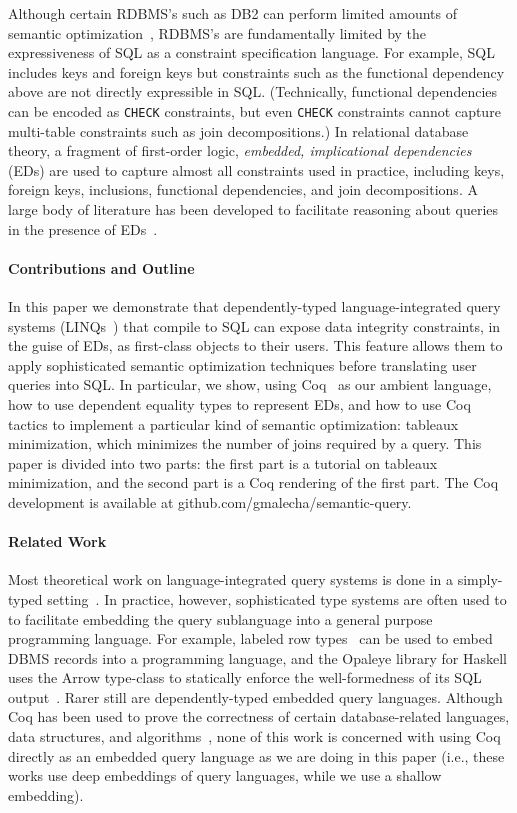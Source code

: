 \documentclass{sigplanconf}
\begin{document}
Although certain RDBMS's such as DB2 can perform limited amounts of semantic optimization~\cite{Cheng:1999:ITS:645925.671357}, RDBMS's are fundamentally limited by the expressiveness of SQL as a constraint specification language.
For example, SQL includes keys and foreign keys but constraints such as the functional dependency above are not directly expressible in SQL. (Technically, functional dependencies can be encoded as {\tt CHECK} constraints, but even {\tt CHECK} constraints cannot capture multi-table constraints such as join decompositions.)
In relational database theory, a fragment of first-order logic, {\it embedded, implicational dependencies} (EDs) are used to capture almost all constraints used in practice, including keys, foreign keys, inclusions, functional dependencies, and join decompositions.
A large body of literature has been developed to facilitate reasoning about queries in the presence of EDs~\cite{Popa99anequational}. 

\paragraph{Contributions and Outline} In this paper we demonstrate that dependently-typed language-integrated query systems (LINQs~\cite{monad}) that compile to SQL can expose data integrity constraints, in the guise of EDs, as first-class objects to their users. This feature allows them to apply sophisticated semantic optimization techniques before translating user queries into SQL.  In particular, we show, using Coq~\cite{coq:coq} as our ambient language, how to use dependent equality types to represent EDs, and how to use Coq tactics to implement a particular kind of semantic optimization: tableaux minimization, which minimizes the number of joins required by a query.  This paper is divided into two parts: the first part is a tutorial on tableaux minimization, and the second part is a Coq rendering of the first part. The Coq development is available at {\sf github.com/gmalecha/semantic-query}.

\paragraph{Related Work} Most theoretical work on language-integrated query systems is done in a simply-typed setting~\cite{tannen:1992:NEQ:645500.655920}.  In practice, however, sophisticated type systems are often used to to facilitate embedding the query sublanguage into a general purpose programming language.  For example, labeled row types~\cite{mpj:jones1996a} can be used to embed DBMS records into a programming language, and the Opaleye library for Haskell uses the Arrow type-class to statically enforce the well-formedness of its SQL output~\cite{opaleye}.  Rarer still are dependently-typed embedded query languages.
Although Coq has been used to prove the correctness of certain database-related languages, data structures, and algorithms~\cite{Malecha:2010:TVR:1706299.1706329,coqdb}, none of this work is concerned with using Coq directly as an embedded query language as we are doing in this paper (i.e., these works use deep embeddings of query languages, while we use a shallow embedding).  
\end{document}
